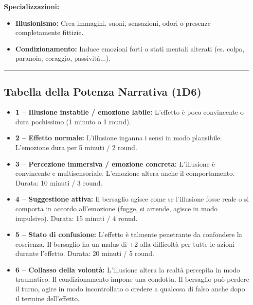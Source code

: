 \documentclass[./magie.tex]{subfiles}
\begin{document}
\textbf{Specializzazioni:}
\begin{itemize}
\item \textbf{Illusionismo:} Crea immagini, suoni, sensazioni, odori o presenze completamente fittizie.
\item \textbf{Condizionamento:} Induce emozioni forti o stati mentali alterati (es. colpa, paranoia, coraggio, passività...).
\end{itemize}
\vspace{0.2cm}
\noindent
\begin{center}
\rule{\textwidth}{0.4pt} 
\end{center}
\vspace{0.2cm}

\subsection*{Tabella della Potenza Narrativa (1D6)}
\begin{itemize}
\item \textbf{1 – Illusione instabile / emozione labile:} L’effetto è poco convincente o dura pochissimo (1 minuto o 1 round).
\item \textbf{2 – Effetto normale:} L’illusione inganna i sensi in modo plausibile. L’emozione dura per 5 minuti / 2 round.
\item \textbf{3 – Percezione immersiva / emozione concreta:} L’illusione è convincente e multisensoriale. L’emozione altera anche il comportamento. Durata: 10 minuti / 3 round.
\item \textbf{4 – Suggestione attiva:} Il bersaglio agisce come se l’illusione fosse reale o si comporta in accordo all’emozione (fugge, si arrende, agisce in modo impulsivo). Durata: 15 minuti / 4 round.
\item \textbf{5 – Stato di confusione:} L’effetto è talmente penetrante da confondere la coscienza. Il bersaglio ha un malus di +2 alla difficoltà per tutte le azioni durante l’effetto. Durata: 20 minuti / 5 round.
\item \textbf{6 – Collasso della volontà:} L’illusione altera la realtà percepita in modo traumatico. Il condizionamento impone una condotta. Il bersaglio può perdere il turno, agire in modo incontrollato o credere a qualcosa di falso anche dopo il termine dell’effetto.
\end{itemize}

\clearpage
\end{document}
